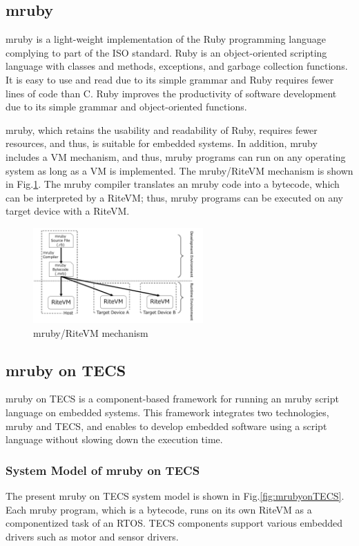 \documentclass[JIP]{ipsj_v2/UTF8/ipsj}
\begin{document}
\subsection{mruby}
\label{sec:mruby}

mruby is a light-weight implementation of the Ruby programming language complying to part of the ISO standard.
Ruby is an object-oriented scripting language \cite{url:Ruby} with classes and methods, exceptions, and garbage collection functions.
It is easy to use and read due to its simple grammar and Ruby requires fewer lines of code than C.
Ruby improves the productivity of software development due to its simple grammar and object-oriented functions.

mruby, which retains the usability and readability of Ruby, requires fewer resources, and thus, is suitable for embedded systems.
In addition, mruby includes a VM mechanism, and thus, mruby programs can run on any operating system as long as a VM is implemented.
The mruby/RiteVM mechanism is shown in Fig.\ref{fig:mruby}.
The mruby compiler translates an mruby code into a bytecode, which can be interpreted by a RiteVM; thus, mruby programs can be executed on any target device with a RiteVM.

\begin{figure}[t]
    \centering
    \includegraphics[width=6.5cm,clip]{figure/mruby.pdf}
    \caption{mruby/RiteVM mechanism}
    \label{fig:mruby}
\end{figure}

\subsection{mruby on TECS}
\label{sec:mrubyonTECS}

mruby on TECS is a component-based framework for running an mruby script language on embedded systems.
This framework integrates two technologies, mruby and TECS, and enables to develop embedded software using a script language without slowing down the execution time. 

\subsubsection{System Model of mruby on TECS}
The present mruby on TECS system model is shown in Fig.\ref{fig:mrubyonTECS}.
Each mruby program, which is a bytecode, runs on its own RiteVM as a componentized task of an RTOS.
TECS components support various embedded drivers such as motor and sensor drivers.
\end{document}
